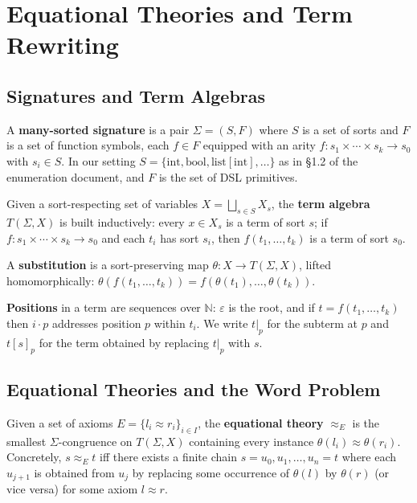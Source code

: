 \documentclass[11pt,a4paper]{article}
\begin{document}
\section{Equational Theories and Term Rewriting}\label{sec:rewriting}

\subsection{Signatures and Term Algebras}\label{sec:signatures}

A \textbf{many-sorted signature} is a pair $\Sigma = (S, F)$ where $S$ is a set of sorts and $F$ is a set of function symbols, each $f \in F$ equipped with an arity $f : s_1 \times \cdots \times s_k \to s_0$ with $s_i \in S$. In our setting $S = \{\mathrm{int}, \mathrm{bool}, \mathrm{list}[\mathrm{int}], \ldots\}$ as in §1.2 of the enumeration document, and $F$ is the set of DSL primitives.

Given a sort-respecting set of variables $X = \bigsqcup_{s \in S} X_s$, the \textbf{term algebra} $T(\Sigma, X)$ is built inductively: every $x \in X_s$ is a term of sort $s$; if $f : s_1 \times \cdots \times s_k \to s_0$ and each $t_i$ has sort $s_i$, then $f(t_1, \ldots, t_k)$ is a term of sort $s_0$.

A \textbf{substitution} is a sort-preserving map $\theta : X \to T(\Sigma, X)$, lifted homomorphically: $\theta(f(t_1,\ldots,t_k)) = f(\theta(t_1),\ldots,\theta(t_k))$.

\textbf{Positions} in a term are sequences over $\mathbb{N}$: $\varepsilon$ is the root, and if $t = f(t_1,\ldots,t_k)$ then $i \cdot p$ addresses position $p$ within $t_i$. We write $t|_p$ for the subterm at $p$ and $t[s]_p$ for the term obtained by replacing $t|_p$ with $s$.

\subsection{Equational Theories and the Word Problem}\label{sec:equational}

Given a set of axioms $E = \{l_i \approx r_i\}_{i \in I}$, the \textbf{equational theory} $\approx_E$ is the smallest $\Sigma$-congruence on $T(\Sigma, X)$ containing every instance $\theta(l_i) \approx \theta(r_i)$. Concretely, $s \approx_E t$ iff there exists a finite chain $s = u_0, u_1, \ldots, u_n = t$ where each $u_{j+1}$ is obtained from $u_j$ by replacing some occurrence of $\theta(l)$ by $\theta(r)$ (or vice versa) for some axiom $l \approx r$.
\end{document}
